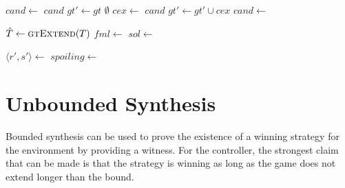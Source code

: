 \documentclass{llncs}
\begin{document}
\begin{algorithm}
    \begin{algorithmic}
        \State $cand \gets $ 
         \Return $cand$ \EndIIf 
        \State $gt' \gets gt$
        \Loop
             \Return $\emptyset $ \EndIIf
            \State $cex \gets $ 
             \Return $cand$ \EndIIf
            \State $gt' \gets gt' \cup cex$
            \State $cand \gets $ 
        \EndLoop
        \EndFunction
    \end{algorithmic}


    \begin{algorithmic}
            \State $\hat{T} \gets \Call{gtExtend}{T}$
            \State $fml \gets $ 
            \State $sol \gets $ 
        \EndFunction
    \end{algorithmic}

    \begin{algorithmic}
                \State $\langle r', s'\rangle \gets $ 
                \State $spoiling \gets $ 
            \EndFor
        \EndFunction
    \end{algorithmic}
\end{algorithm}

\section{Unbounded Synthesis}

Bounded synthesis can be used to prove the existence of a winning strategy for
the environment by providing a witness. For the controller, the strongest claim
that can be made is that the strategy is winning as long as the game does not
extend longer than the bound.
\end{document}

